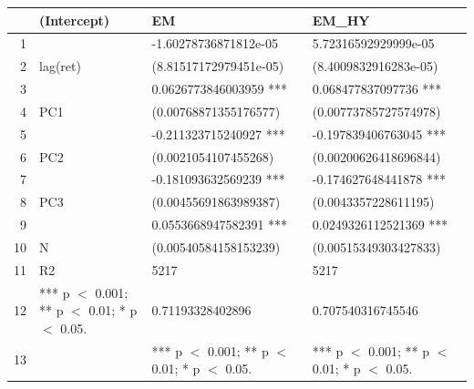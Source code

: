 \documentclass[11pt,preprint, authoryear]{elsarticle}
\let\origtable\table
\let\endorigtable\endtable
\renewenvironment{table}[1][2] {
    \expandafter\origtable\expandafter[H]
} {
    \endorigtable
}
\numberwithin{equation}{section}
\numberwithin{figure}{section}
\numberwithin{table}{section}
\begin{document}
\begin{table}[H]
\centering
\begin{tabular}{rlll}
  \hline
 & (Intercept) & EM & EM\_HY \\ 
  \hline
1 &  & -1.60278736871812e-05 & 5.72316592929999e-05 \\ 
  2 & lag(ret) & (8.81517172979451e-05) & (8.4009832916283e-05) \\ 
  3 &  & 0.0626773846003959 *** & 0.068477837097736 *** \\ 
  4 & PC1 & (0.00768871355176577) & (0.00773785727574978) \\ 
  5 &  & -0.211323715240927 *** & -0.197839406763045 *** \\ 
  6 & PC2 & (0.0021054107455268) & (0.00200626418696844) \\ 
  7 &  & -0.181093632569239 *** & -0.174627648441878 *** \\ 
  8 & PC3 & (0.00455691863989387) & (0.0043357228611195) \\ 
  9 &  & 0.0553668947582391 *** & 0.0249326112521369 *** \\ 
  10 & N & (0.00540584158153239) & (0.00515349303427833) \\ 
  11 & R2 & 5217 & 5217 \\ 
  12 & *** p $<$ 0.001;  ** p $<$ 0.01;  * p $<$ 0.05. & 0.71193328402896 & 0.707540316745546 \\ 
  13 &  & *** p $<$ 0.001;  ** p $<$ 0.01;  * p $<$ 0.05. & *** p $<$ 0.001;  ** p $<$ 0.01;  * p $<$ 0.05. \\ 
   \hline
\end{tabular}
\caption{PCA Results} 
\end{table}
\end{document}
